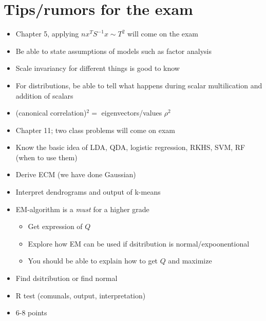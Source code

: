 \section{Tips/rumors for the exam}
\begin{itemize}
  \item Chapter 5, applying $nx^TS^{-1}x\sim T^2$ will come on the exam
  \item Be able to state assumptions of models such as factor analysis
  \item Scale invariancy for different things is good to know
  \item For distributions, be able to tell what happens during scalar multilication and addition of scalars
  \item (canonical correlation)$^2 = $ eigenvectors/values $\rho^2$
  \item Chapter 11; two class problems will come on exam
  \item Know the basic idea of LDA, QDA, logistic regression, RKHS, SVM, RF (when to use them)
  \item Derive ECM (we have done Gaussian)
  \item Interpret dendrograms and output of k-means
  \item EM-algorithm is a \textit{must} for a higher grade
    \begin{itemize}
      \item Get expression of $Q$
      \item Explore how EM can be used if dsitribution is normal/expoonentional
      \item You should be able to explain how to get $Q$ and maximize
    \end{itemize}
  \item Find dsitribution or find normal
  \item R test (comunals, output, interpretation)
  \item 6-8 points 
\end{itemize}

